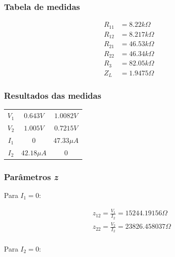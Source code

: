 \documentclass[12pt,twoside, a4paper, twocolumn]{article}
\begin{document}
\subsubsection{Tabela de medidas}
\begin{equation}
    \begin{aligned}
        R_{11} & = 8.22k \varOmega  \\
        R_{12} & = 8.217k \varOmega \\
        R_{21} & = 46.53k \varOmega \\
        R_{22} & = 46.34k \varOmega \\
        R_{3}  & = 82.05k \varOmega \\
        Z_L    & = 1.9475 \varOmega
    \end{aligned}
\end{equation}


\subsubsection{Resultados das medidas}


\begin{center}
    \begin{tabular}{ |c|c|c| }
        \hline
        $V_1$ & $0.643 V$     & $1.0082 V$    \\
        $V_2$ & $1.005 V$     & $0.7215 V$    \\
        $I_1$ & $0$           & $47.33 \mu A$ \\
        $I_2$ & $42.18 \mu A$ & $0$           \\
        \hline
    \end{tabular}
\end{center}


\subsubsection{Parâmetros \emph{z}}


Para $I_1 = 0$:


\begin{equation}
    \begin{aligned}
         & z_{12} = \frac{V_1}{I_2} =  15244.19156 \varOmega \\
         & z_{22} = \frac{V_2}{I_2} = 23826.458037 \varOmega \\
    \end{aligned}
\end{equation}


Para $I_2 = 0$:
\end{document}
